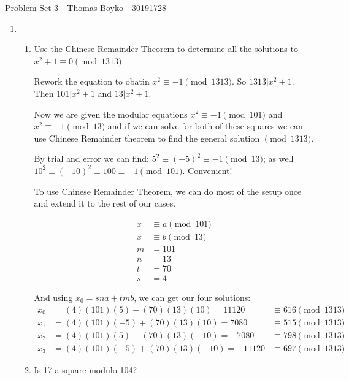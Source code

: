 \documentclass{article}
\begin{document}
    \huge Problem Set 3 - Thomas Boyko - 30191728
    \normalsize
\begin{enumerate} 
    \item \begin{enumerate}[label= (\alph*)] 
        \item Use the Chinese Remainder Theorem to determine all the solutions to $x^2+1\equiv 0\pmod{1313}$.

            Rework the equation to obatin $x^2\equiv -1\pmod{1313}$. So $1313|x^2+1$. Then $101|x^2+1$
            and $13|x^2+1$.

            Now we are given the modular equations $x^2\equiv -1\pmod{101}$ and $x^2\equiv -1\pmod{13}$
            and if we can solve for both of these squares we can use Chinese Remainder theorem to 
            find the general solution $\pmod{1313}$.

            By trial and error we can find: $5^2\equiv (-5)^2\equiv-1\pmod{13}$; as well 
            $10^2\equiv (-10)^2\equiv 100\equiv -1\pmod{101}$. Convenient!

            To use Chinese Remainder Theorem, we can do most of the setup once and extend it to the 
            rest of our cases.

            \begin{align*}
                x&\equiv a\pmod{101}\\
                x&\equiv b\pmod{13}\\
                m&= 101 \\
                n&= 13 \\
                t&= 70 \\
                s&= 4 
            \end{align*}

            And using $x_0=sna+tmb$, we can get our four solutions:
            \begin{align*}
                x_0&=(4)(101)(5)+(70)(13)(10)=11120&\equiv 616\pmod{1313}\\
                x_1&=(4)(101)(-5)+(70)(13)(10)=7080&\equiv 515\pmod{1313}\\
                x_2&=(4)(101)(5)+(70)(13)(-10)=-7080&\equiv 798\pmod{1313}\\
                x_3&=(4)(101)(-5)+(70)(13)(-10)=-11120&\equiv 697\pmod{1313}
            \end{align*}


        \item Is 17 a square modulo 104?


\end{enumerate}
\end{enumerate}
\end{document}
